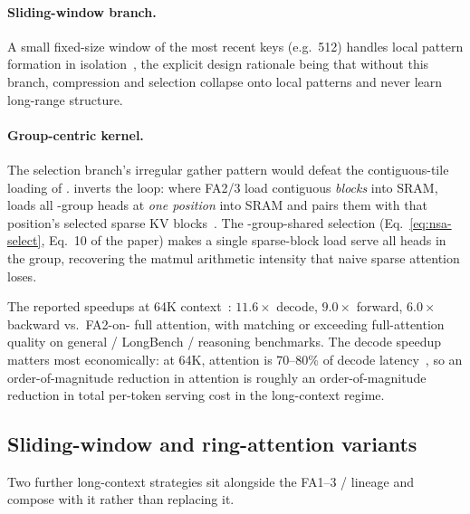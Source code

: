 \paragraph{Sliding-window branch.} A small fixed-size window of the
most recent keys (e.g.\ 512) handles local pattern formation in
isolation~\citep[\S 3.3.3]{yuan2025}, the explicit design rationale
being that without this branch, compression and selection collapse
onto local patterns and never learn long-range structure.

\paragraph{Group-centric kernel.} The selection branch's irregular
gather pattern would defeat the contiguous-tile loading of .
 inverts the loop: where FA2/3 load contiguous \emph{ blocks}
into SRAM,  loads all -group heads at \emph{one  position}
into SRAM and pairs them with that position's selected sparse KV
blocks~\citep[\S 3.4]{yuan2025}. The -group-shared selection
(Eq.~\eqref{eq:nsa-select}, Eq.~10 of the paper) makes a single
sparse-block load serve all heads in the group, recovering the matmul
arithmetic intensity that naive sparse attention loses.

The reported speedups at 64K context~\citep[Fig.~1]{yuan2025}:
$11.6\times$ decode, $9.0\times$ forward, $6.0\times$ backward vs.\
FA2-on- full attention, with  matching or exceeding full-attention
quality on general / LongBench / reasoning benchmarks. The decode
speedup matters most economically: at 64K, attention is 70--80\% of
decode latency~\citep[\S 1]{yuan2025}, so an order-of-magnitude
reduction in attention is roughly an order-of-magnitude reduction in
total per-token serving cost in the long-context regime.

\subsection{Sliding-window and ring-attention variants}
\label{sec:sliding-ring}

Two further long-context strategies sit alongside the FA1--3 / 
lineage and compose with it rather than replacing it.

